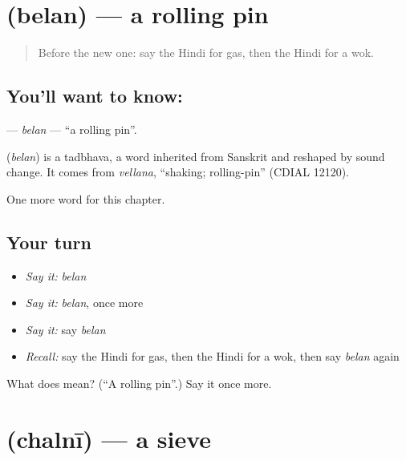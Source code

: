 \section[\texorpdfstring{\hi{बेलन} (belan)}{बेलन (belan)}]{ (belan) — a rolling pin}

\label{lesson:HI-C269-belan}



\begin{quote}
Before the new one: say the Hindi for gas, then the Hindi for a wok.
\end{quote}

\subsection*{You'll want to know: }
\textbf{} — \emph{belan} — \textquotedblleft{}a rolling pin\textquotedblright{}.

\begin{cousinweb}
\textbf{} (\emph{belan}) is a tadbhava, a word inherited from Sanskrit and reshaped by sound change. It comes from \emph{vellana}, \textquotedblleft{}shaking; rolling-pin\textquotedblright{} (CDIAL 12120).
\end{cousinweb}

\begin{grammarlens}[title={What you've built}]
One more word for this chapter.
\end{grammarlens}

\subsection*{Your turn}
\begin{itemize}
\raggedright
  \item \emph{Say it:} \emph{belan}
  \item \emph{Say it:} \emph{belan}, once more
  \item \emph{Say it:} say \emph{belan}
  \item \emph{Recall:} say the Hindi for gas, then the Hindi for a wok, then say \emph{belan} again
\end{itemize}

\begin{tcolorbox}[breakable,colback=teal!4,colframe=teal!35!black,title={Before you move on}]
What does  mean? (\textquotedblleft{}A rolling pin\textquotedblright{}.) Say it once more.
\end{tcolorbox}
\section[\texorpdfstring{\hi{छलनी} (chalnī)}{छलनी (chalnī)}]{ (chalnī) — a sieve}

